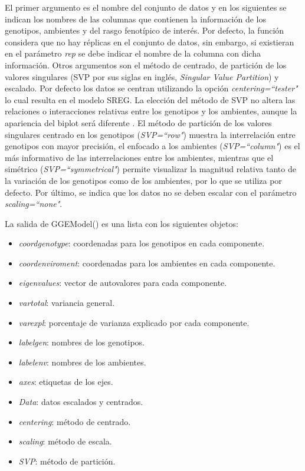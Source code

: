 El primer argumento es el nombre del conjunto de datos y en los siguientes se indican los nombres de las columnas que contienen la información de los genotipos, ambientes y del rasgo fenotípico de interés. Por defecto, la función considera que no hay réplicas en el conjunto de datos, sin embargo, si existieran en el parámetro \emph{rep} se debe indicar el nombre de la columna con dicha información. Otros argumentos son el método de centrado, de partición de los valores singulares (SVP por sus siglas en inglés, \emph{Singular Value Partition}) y escalado. Por defecto los datos se centran utilizando la opción \emph{centering=``tester"} lo cual resulta en el modelo SREG. La elección del método de SVP no altera las relaciones o interacciones relativas entre los genotipos y los ambientes, aunque la apariencia del biplot será diferente \citep{Yan2002}. El método de partición de los valores singulares centrado en los genotipos (\emph{SVP=``row"}) muestra la interrelación entre genotipos con mayor precisión, el enfocado a los ambientes (\emph{SVP=``column"}) es el más informativo de las interrelaciones entre los ambientes, mientras que el simétrico (\emph{SVP=``symmetrical"}) permite visualizar la magnitud relativa tanto de la variación de los genotipos como de los ambientes, por lo que se utiliza por defecto. Por último, se indica que los datos no se deben escalar con el parámetro \emph{scaling=``none"}. 

La salida de \textcolor{fandango}{GGEModel()} es una lista con los siguientes objetos:
\begin{itemize}
\item \emph{coordgenotype}: coordenadas para los genotipos en cada componente.
\item \emph{coordenviroment}: coordenadas para los ambientes en cada componente.
\item \emph{eigenvalues}: vector de autovalores para cada componente.
\item \emph{vartotal}: variancia general.
\item \emph{varexpl}: porcentaje de varianza explicado por cada componente.
\item \emph{labelgen}: nombres de los genotipos.
\item \emph{labelenv}: nombres de los ambientes.
\item \emph{axes}: etiquetas de los ejes.
\item \emph{Data}: datos escalados y centrados.
\item \emph{centering}: método de centrado.
\item \emph{scaling}: método de escala.
\item \emph{SVP}: método de partición. 
\end{itemize}


